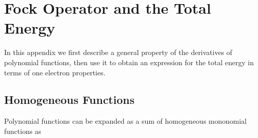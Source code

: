 \documentclass[titlepage]{article}%
\begin{document}
\section{\bigskip Fock Operator and the Total Energy\label{Fock&Energy}}

In this appendix we first describe a general property of the derivatives of
polynomial functions, then use it to obtain an expression for the total energy
in terms of one electron properties.

\subsection{Homogeneous Functions\label{HomFunc}}

Polynomial functions can be expanded as a sum of homogeneous mononomial
functions as%
\end{document}

